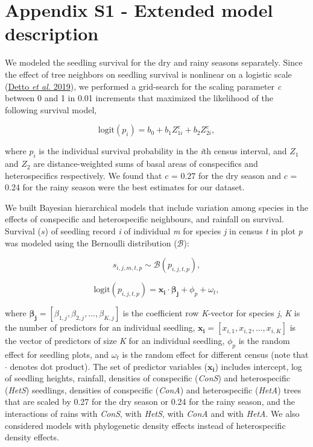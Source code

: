 \documentclass[
  12pt,
  letterpaper,
  DIV=11,
  numbers=noendperiod]{scrartcl}
\author{}
\date{}
\begin{document}
\ifdefined\Shaded\renewenvironment{Shaded}{\begin{tcolorbox}[frame hidden, sharp corners, interior hidden, borderline west={3pt}{0pt}{shadecolor}, enhanced, breakable, boxrule=0pt]}{\end{tcolorbox}}\fi

\hypertarget{appendix-s1---extended-model-description}{%
\section{Appendix S1 - Extended model
description}\label{appendix-s1---extended-model-description}}

We modeled the seedling survival for the dry and rainy seasons
separately. Since the effect of tree neighbors on seedling survival is
nonlinear on a logistic scale (\protect\hyperlink{ref-Detto2019}{Detto
\emph{et al.} 2019}), we performed a grid-search for the scaling
parameter \emph{c} between 0 and 1 in 0.01 increments that maximized the
likelihood of the following survival model,

\[
\mathrm{logit}(p_i) = b_0 + b_1 Z_{1i}^c + b_2 Z_{2i}^c,
\]

where \(p_i\) is the individual survival probability in the \emph{i}th
census interval, and \(Z_1\) and \(Z_2\) are distance-weighted sums of
basal areas of conspecifics and heterospecifics respectively. We found
that \(c\) = 0.27 for the dry season and \(c\) = 0.24 for the rainy
season were the best estimates for our dataset.

We built Bayesian hierarchical models that include variation among
species in the effects of conspecific and heterospecific neighbours, and
rainfall on survival. Survival (\(s\)) of seedling record \emph{i} of
individual \emph{m} for species \emph{j} in census \emph{t} in plot
\emph{p} was modeled using the Bernoulli distribution (\(\mathcal{B}\)):

\[
s_{i,j,m,t,p} \sim \mathcal{B}(p_{i, j, t, p}),
\]

\[
\mathrm{logit}(p_{i,j,t,p}) = \boldsymbol{x_{i}} \cdot \boldsymbol{\beta_{j}} + \phi_p + \omega_t,
\]

where
\(\boldsymbol{\beta_{j}} = \left[\beta_{1,j}, \beta_{2,j}, \ldots, \beta_{K,j} \right]\)
is the coefficient row \emph{K}-vector for species \emph{j}, \emph{K} is
the number of predictors for an individual seedling,
\(\boldsymbol{x_i} = \left[x_{i,1},x _{i,2}, \ldots,x_{i,K} \right]\) is
the vector of predictors of size \emph{K} for an individual seedling,
\(\phi_p\) is the random effect for seedling plots, and \(\omega_t\) is
the random effect for different census (note that \(\cdot\) denotes dot
product). The set of predictor variables (\(\boldsymbol{x_i}\)) includes
intercept, log of seedling heights, rainfall, densities of conspecific
(\emph{ConS}) and heterospecific (\emph{HetS}) seedlings, densities of
conspecific (\emph{ConA}) and heterospecific (\emph{HetA}) trees that
are scaled by 0.27 for the dry season or 0.24 for the rainy season, and
the interactions of rains with \emph{ConS}, with \emph{HetS}, with
\emph{ConA} and with \emph{HetA}. We also considered models with
phylogenetic density effects instead of heterospecific density effects.
\end{document}
